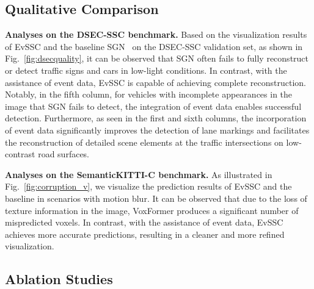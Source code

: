 \subsection{Qualitative Comparison}
\noindent \textbf{Analyses on the DSEC-SSC benchmark.}
Based on the visualization results of EvSSC and the baseline SGN~\cite{mei2024sgn} on the DSEC-SSC validation set, as shown in Fig.~\ref{fig:dsecquality}, it can be observed that SGN often fails to fully reconstruct or detect traffic signs and cars in low-light conditions. 
In contrast, with the assistance of event data, EvSSC is capable of achieving complete reconstruction. Notably, in the fifth column, for vehicles with incomplete appearances in the image that SGN fails to detect, the integration of event data enables successful detection. 
Furthermore, as seen in the first and sixth columns, the incorporation of event data significantly improves the detection of lane markings and facilitates the reconstruction of detailed scene elements at the traffic intersections on low-contrast road surfaces.

\noindent \textbf{Analyses on the SemanticKITTI-C benchmark.}
As illustrated in Fig.~\ref{fig:corruption_v}, we visualize the prediction results of EvSSC and the baseline in scenarios with motion blur. It can be observed that due to the loss of texture information in the image, VoxFormer produces a significant number of mispredicted voxels. In contrast, with the assistance of event data, EvSSC achieves more accurate predictions, resulting in a cleaner and more refined visualization.


\subsection{Ablation Studies}
%

